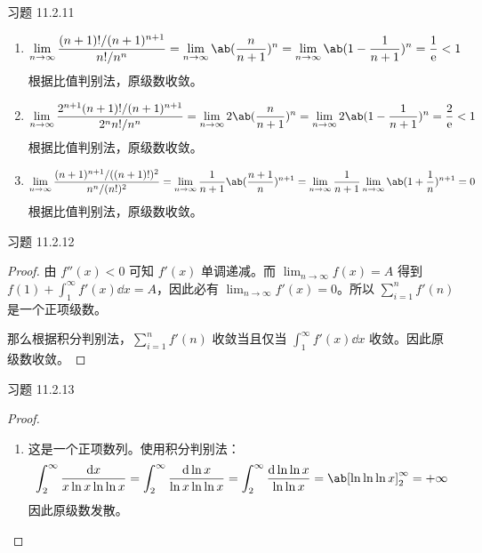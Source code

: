 \begin{problem}
    习题 11.2.11
    \begin{solution}
        \begin{enumerate}
            \item[\textbf{3)}]
            $$
            \lim_{n \to \infty} \frac{(n + 1)! / (n + 1)^{n + 1}}{n! / n^{n}} = \lim_{n \to \infty} \ab(\frac{n}{n + 1})^{n} = \lim_{n \to \infty} \ab(1 - \frac{1}{n + 1})^{n} = \frac{1}{\E} < 1
            $$
            根据比值判别法，原级数收敛。

            \item[\textbf{4)}]
            $$
            \lim_{n \to \infty} \frac{2^{n + 1} (n + 1)! / (n + 1)^{n + 1}}{2^{n} n! / n^{n}} = \lim_{n \to \infty} 2 \ab(\frac{n}{n + 1})^{n} = \lim_{n \to \infty} 2 \ab(1 - \frac{1}{n + 1})^{n} = \frac{2}{\E} < 1
            $$
            根据比值判别法，原级数收敛。

            \item[\textbf{5)}]
            $$
            \lim_{n \to \infty} \frac{(n + 1)^{n + 1} / ((n + 1)!)^2}{n^{n} / (n!)^2} = \lim_{n \to \infty} \frac{1}{n + 1} \ab(\frac{n + 1}{n})^{n + 1} = \lim_{n \to \infty} \frac{1}{n + 1} \lim_{n \to \infty} \ab(1 + \frac{1}{n})^{n + 1} = 0
            $$
            根据比值判别法，原级数收敛。
        \end{enumerate}
    \end{solution}
\end{problem}

\begin{problem}
    习题 11.2.12
    \begin{proof}
        由 $f''(x) < 0$ 可知 $f'(x)$ 单调递减。而 $\lim_{n \to \infty} f(x) = A$ 得到 $\displaystyle f(1) + \int_1^{\infty} f'(x) \dd{x} = A$，因此必有 $\lim_{n \to \infty} f'(x) = 0$。所以 $\sum_{i = 1}^{n} f'(n)$ 是一个正项级数。

        那么根据积分判别法，$\sum_{i = 1}^{n} f'(n)$ 收敛当且仅当 $\int_1^{\infty} f'(x) \dd{x}$ 收敛。因此原级数收敛。
    \end{proof}
\end{problem}

\begin{problem}
    习题 11.2.13
    \begin{proof}
        \begin{enumerate}
            \item[\textbf{3)}] 这是一个正项数列。使用积分判别法：
            $$
            \int_2^{\infty} \frac{\dd{x}}{x \ln x \ln \ln x} = \int_2^{\infty} \frac{\dd{\ln x}}{\ln x \ln \ln x} = \int_2^{\infty} \frac{\dd{\ln \ln x}}{\ln \ln x} = \ab[\ln \ln \ln x]_2^{\infty} = +\infty
            $$
            因此原级数发散。
        \end{enumerate}
    \end{proof}
\end{problem}